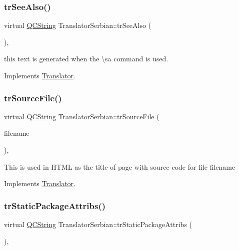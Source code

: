 \subsubsection{\texorpdfstring{trSeeAlso()}{trSeeAlso()}}
{\footnotesize\ttfamily virtual \mbox{\hyperlink{class_q_c_string}{Q\+C\+String}} Translator\+Serbian\+::tr\+See\+Also (\begin{DoxyParamCaption}{ }\end{DoxyParamCaption})\hspace{0.3cm}{\ttfamily [inline]}, {\ttfamily [virtual]}}

this text is generated when the \textbackslash{}sa command is used. 

Implements \mbox{\hyperlink{class_translator}{Translator}}.

\mbox{\label{class_translator_serbian_aacfb33777ad8b676f1301b7504a4ca9c}} 
\subsubsection{\texorpdfstring{trSourceFile()}{trSourceFile()}}
{\footnotesize\ttfamily virtual \mbox{\hyperlink{class_q_c_string}{Q\+C\+String}} Translator\+Serbian\+::tr\+Source\+File (\begin{DoxyParamCaption}\item[{\mbox{\hyperlink{class_q_c_string}{Q\+C\+String}} \&}]{filename }\end{DoxyParamCaption})\hspace{0.3cm}{\ttfamily [inline]}, {\ttfamily [virtual]}}

This is used in H\+T\+ML as the title of page with source code for file filename 

Implements \mbox{\hyperlink{class_translator}{Translator}}.

\mbox{\label{class_translator_serbian_a03dcbb2a37d9e3b4c4d7647f3bc5b22d}} 
\subsubsection{\texorpdfstring{trStaticPackageAttribs()}{trStaticPackageAttribs()}}
{\footnotesize\ttfamily virtual \mbox{\hyperlink{class_q_c_string}{Q\+C\+String}} Translator\+Serbian\+::tr\+Static\+Package\+Attribs (\begin{DoxyParamCaption}{ }\end{DoxyParamCaption})\hspace{0.3cm}{\ttfamily [inline]}, {\ttfamily [virtual]}}


